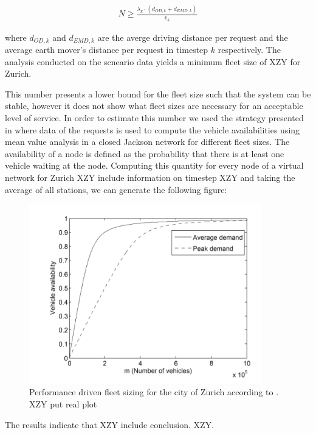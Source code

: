\begin{align}
N \geq \frac{\lambda_k \cdot (d_{OD,k} + d_{EMD,k} )}{v_k}
\end{align}

where $d_{OD,k}$ and $d_{EMD,k}$ are the averge driving distance per request and the average earth mover's distance per request in timestep $k$ respectively. The analysis conducted on the scneario data yields a minimum fleet size of XZY for Zurich.

This number presents a lower bound for the fleet size such that the system can be stable, however it does not show what fleet sizes are necessary for an acceptable level of service. In order to estimate this number we used the strategy presented in \cite{spieser2014toward} where data of the requests is used to compute the vehicle availabilities using mean value analysis in a closed Jackson network for different fleet sizes. The availability of a node is defined as the probability that there is at least one vehicle waiting at the node. Computing this quantity for every node of a virtual network for Zurich  XZY include information on timestep XZY and taking the average of all stations, we can generate the following figure:




\begin{figure}[h]
\begin{center}\includegraphics[width=0.9\textwidth]{figures/performancePlot.png}\end{center}
\caption{Performance driven fleet sizing for the city of Zurich according to \cite{spieser2014toward}. XZY put real plot}
\label{fig:performanceFleetSize}
\end{figure}

The results indicate that XZY include conclusion. XZY.
